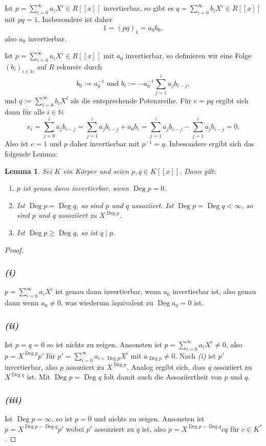 \documentclass[a4paper,10pt]{article}
\newcounter{satze}
\newtheorem{lem}[satze]{Lemma}
\newcommand{\N}{\mathbb{N}}
\newcommand{\Deg}{\operatorname{Deg}}
\begin{document}
\subsection{}
Ist $p = \sum_{i=0}^\infty a_i X^i \in R[\![x]\!]$ invertierbar, so gibt es $q = \sum_{i=0}^\infty b_i X^i \in R[\![x]\!]$ mit $pq = 1$. Insbesondere ist daher
\[
 1 = (pq)_1 = a_0 b_0,
\]
also $a_0$ invertierbar.

Ist $p = \sum_{i=0}^\infty a_i X^i \in R[\![x]\!]$ mit $a_0$ invertierbar, so definieren wir eine Folge $(b_i)_{i \in \N}$ auf $R$ rekursiv durch
\[
 b_0 := a_0^{-1} \text{ und } b_i := -a_0^{-1} \sum_{j=1}^i a_j b_{i-j},
\]
und $q := \sum_{i=0}^\infty b_i X^i$ als die entsprechende Potenzreihe. Für $e = pq$ ergibt sich dann für alle $i \in \N$
\[
 e_i
 = \sum_{j=0}^i a_j b_{i-j}
 = \sum_{j=1}^i a_j b_{i-j} + a_0 b_i
 = \sum_{j=1}^i a_j b_{i-j} - \sum_{j=1}^i a_j b_{i-j}
 = 0.
\]
Also ist $e = 1$ und $p$ daher invertierbar mit $p^{-1} = q$. Inbesondere ergibt sich das folgende Lemma:

\begin{lem} \label{lem: starkes Lemma}
 Sei $K$ ein Körper und seien $p,q \in K[\![x]\!]$. Dann gilt:
 \begin{enumerate}
  \item $p$ ist genau dann invertierbar, wenn $\Deg p = 0$.
  \item Ist $\Deg p = \Deg q$, so sind $p$ und $q$ assoziiert. Ist $\Deg p = \Deg q < \infty$, so sind $p$ und $q$ assoziiert zu $X^{\Deg p}$.
  \item Ist $\Deg p \geq \Deg q$, so ist $q \mid p$.
 \end{enumerate}
\end{lem}
\begin{proof}
 \subsubsection*{\textit{(i)}}
  $p = \sum_{i=0}^{\infty} a_i X^i$ ist genau dann invertierbar, wenn $a_0$ invertierbar ist, also genau dann wenn $a_0 \neq 0$, was wiederum äquivalent zu $\Deg a_0 = 0$ ist.
 \subsubsection*{\textit{(ii)}}
  Ist $p = q = 0$ so ist nichts zu zeigen. Ansonsten ist $p = \sum_{i=0}^\infty a_i X^i \neq 0$, also $p = X^{\Deg p} p'$ für $p' = \sum_{i=0}^\infty a_{i+\Deg p} X^i$ mit $a_{\Deg p} \neq 0$. Nach \textit{(i)} ist $p'$ invertierbar, also $p$ assoziiert zu $X^{\Deg p}$. Analog ergibt sich, dass $q$ assoziiert zu $X^{\Deg q}$ ist. Mit $\Deg p = \Deg q$ folt damit auch die Assoziiertheit von $p$ und $q$.
 \subsubsection*{\textit{(iii)}}
 Ist $\Deg p = \infty$, so ist $p = 0$ und nichts zu zeigen. Ansonsten ist $p = X^{\Deg p - \Deg q} p'$ wobei $p'$ assozziert zu $q$ ist, also $p = X^{\Deg p - \Deg q} c q$ für $c \in K^*$.
\end{proof}
\end{document}
